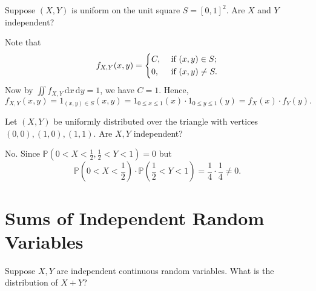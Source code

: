 \begin{eg}
    Suppose \((X, Y)\) is uniform on the unit square \(S = [0, 1]^2\). Are \(X\) and \(Y\) independent?    
\end{eg}

\begin{explanation}
    Note that
    \[
        f_{X, Y}(x, y) = \begin{dcases}
            C, &\text{ if } (x, y) \in S  ;\\
            0, &\text{ if } (x, y) \neq S.
        \end{dcases}
    \]
    Now by \(\iint f_{X, Y} \, \mathrm{d} x \, \mathrm{d} y = 1\), we have \(C = 1\). Hence,
    \[
        f_{X, Y}(x,y) = 1_{(x, y) \in S}(x,y) = 1_{0 \le x \le 1} (x) \cdot 1_{0 \le y \le 1}(y) = f_X(x) \cdot f_Y(y).
    \]   
\end{explanation}


\begin{eg}
    Let \((X, Y)\) be uniformly distributed over the triangle with vertices \((0, 0), (1, 0), (1, 1)\). Are \(X, Y\) independent?   
\end{eg}

\begin{explanation}
    No. Since \(\mathbb{P} (0 < X < \frac{1}{2}, \frac{1}{2} < Y < 1) = 0\) but 
    \[
        \mathbb{P} (0 < X < \frac{1}{2}) \cdot \mathbb{P} (\frac{1}{2} < Y < 1) = \frac{1}{4} \cdot \frac{1}{4} \neq 0.
    \] 
\end{explanation}

\section{Sums of Independent Random Variables}
\begin{question}
    Suppose \(X, Y\) are independent continuous random variables. What is the distribution of \(X + Y\)?  
\end{question}

